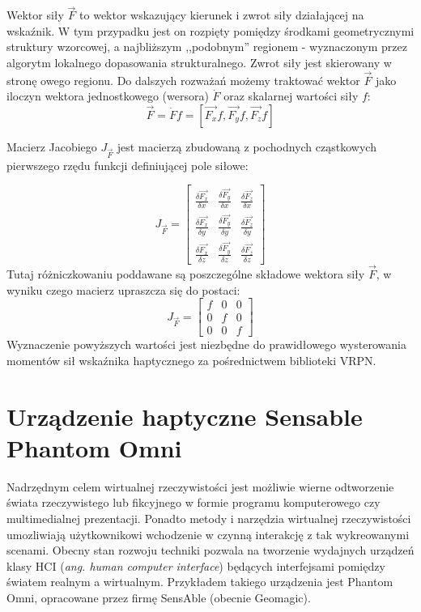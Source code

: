 \documentclass[licencjacka]{pracamgr}
\begin{document}
Wektor siły $\vec{F}$ to wektor wskazujący kierunek i zwrot siły działającej na wskaźnik. W tym przypadku jest on rozpięty pomiędzy środkami geometrycznymi struktury wzorcowej, a najbliższym ,,podobnym'' regionem - wyznaczonym przez algorytm lokalnego dopasowania strukturalnego. Zwrot siły jest skierowany w stronę owego regionu. Do dalszych rozważań możemy traktować wektor $\vec{F}$ jako iloczyn wektora jednostkowego (wersora) $\dot{F}$ oraz skalarnej wartości siły $f$:
$$
\vec{F}=\dot{F}f=[\vec{F_x}f,\vec{F_y}f,\vec{F_z}f]
$$

Macierz Jacobiego $J_{\vec{F}}$ jest macierzą zbudowaną z pochodnych cząstkowych pierwszego rzędu funkcji definiującej pole siłowe:

$$
J_{\vec{F}}=
\begin{bmatrix}
\frac{\delta \vec{F_x}}{\delta x} & \frac{\delta \vec{F_y}}{\delta x} & \frac{\delta \vec{F_z}}{\delta x} \\
\frac{\delta \vec{F_x}}{\delta y} & \frac{\delta \vec{F_y}}{\delta y} & \frac{\delta \vec{F_z}}{\delta y} \\
\frac{\delta \vec{F_x}}{\delta z} & \frac{\delta \vec{F_y}}{\delta z} & \frac{\delta \vec{F_z}}{\delta z}
\end{bmatrix}
$$
Tutaj różniczkowaniu poddawane są poszczególne składowe wektora siły $\vec{F}$, w wyniku czego macierz upraszcza się do postaci:
$$
J_{\vec{F}}=
\begin{bmatrix}
f & 0 & 0 \\
0 & f & 0 \\
0 & 0 & f
\end{bmatrix}
$$
Wyznaczenie powyższych wartości jest niezbędne do prawidłowego wysterowania momentów sił wskaźnika haptycznego za pośrednictwem biblioteki VRPN.

\chapter{Urządzenie haptyczne Sensable Phantom Omni}
Nadrzędnym celem wirtualnej rzeczywistości jest możliwie wierne odtworzenie świata rzeczywistego lub fikcyjnego w formie programu komputerowego czy multimedialnej prezentacji. Ponadto metody i narzędzia wirtualnej rzeczywistości umozliwiają użytkownikowi wchodzenie w czynną interakcję z tak wykreowanymi scenami. Obecny stan rozwoju techniki pozwala na tworzenie wydajnych urządzeń klasy HCI (\textit{ang. human computer interface}) będących interfejsami pomiędzy światem realnym a wirtualnym. Przykładem takiego urządzenia jest Phantom Omni, opracowane przez firmę SensAble (obecnie Geomagic). 
\end{document}
